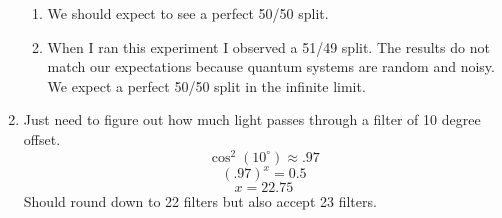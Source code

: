 \documentclass[12pt]{article}
\begin{document}
\begin{enumerate}[font=\bfseries]
\begin{enumerate}
        \item We should expect to see a perfect 50/50 split.
        \item When I ran this experiment I observed a 51/49 split. The results do not match our expectations because quantum systems are random and noisy. We expect a perfect 50/50 split in the infinite limit.
    \end{enumerate}
    \item 
    Just need to figure out how much light passes through a filter of 10 degree offset.
    \[\cos^2({10^{\circ}}) \approx .97 \]
            \[(.97)^x = 0.5\]
            \[x = 22.75\]
            Should round down to 22 filters but also accept 23 filters.
\end{enumerate}
\end{document}
